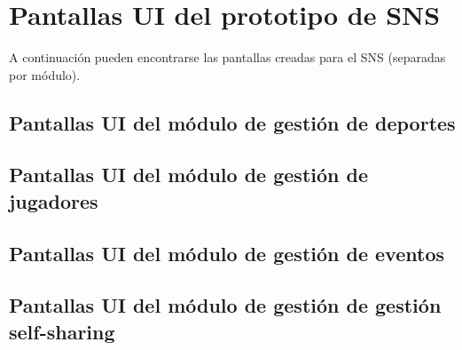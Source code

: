\chapter{Pantallas UI del prototipo de SNS}
\label{app:ui}

A continuación pueden encontrarse las pantallas creadas para el SNS (separadas por módulo).

\section{Pantallas UI del módulo de gestión de deportes}

\clearpage

\section{Pantallas UI del módulo de gestión de jugadores}

\clearpage

\section{Pantallas UI del módulo de gestión de eventos}

\clearpage

\section{Pantallas UI del módulo de gestión de gestión self-sharing}

\clearpage